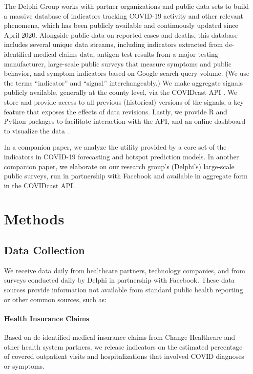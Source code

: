 \documentclass[9pt,twocolumn,twoside,lineno]{pnas-new}
\begin{document}
The Delphi Group works with partner organizations and public data sets to build
a massive database of indicators tracking COVID-19 activity and other relevant
phenomena, which has been publicly available and continuously updated since
April 2020. Alongside public data on reported cases and deaths, this database
includes several unique data streams, including indicators extracted from
de-identified medical claims data, antigen test results from a major testing
manufacturer, large-scale public surveys that measure symptoms and public
behavior, and symptom indicators based on Google search query volume. (We use
the terms ``indicator'' and ``signal'' interchangeably.) We make aggregate
signals publicly available, generally at the county level, via the COVIDcast API  
\cite{CovidcastAPI}. We store and provide access to all previous (historical)
versions of the signals, a key feature that exposes the effects of data
revisions.  Lastly, we provide R \cite{CovidcastR} and Python \cite{CovidcastPy}  
packages to facilitate interaction with the API, and an online dashboard to
visualize the data \cite{CovidcastViz}. 


In a companion paper, we analyze the utility provided by a core set of the
indicators in COVID-19 forecasting and hotspot prediction models.  In another
companion paper, we elaborate on our research group's (Delphi's) large-scale
public surveys, run in partnership with Facebook and available in aggregate form
in the COVIDcast API.

\section{Methods}

\subsection{Data Collection}

We receive data daily from healthcare partners, technology companies, and from
surveys conducted daily by Delphi in partnership with Facebook. These data
sources provide information not available from standard public health reporting
or other common sources, such as:

\paragraph{Health Insurance Claims} Based on de-identified medical insurance 
claims from Change Healthcare and other health system partners, we release
indicators on the estimated percentage of covered outpatient visits and
hospitalizations that involved COVID diagnoses or symptoms.
\end{document}
